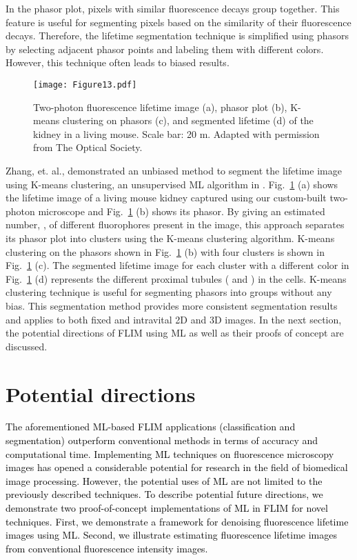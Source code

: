 \documentclass[12pt]{iopart}
\newcommand{\cc}[1]{\textcolor{black}{#1}}
\begin{document}
In the phasor plot, pixels with similar fluorescence decays group together. This feature is useful for segmenting pixels based on the similarity of their fluorescence decays. Therefore, the lifetime segmentation technique is simplified using phasors by selecting adjacent phasor points and labeling them with different colors. However, this technique often leads to biased results.  

\begin{figure}[!t]
\centering
\texttt{[image: Figure13.pdf]}
\caption{Two-photon fluorescence lifetime image (a), phasor plot (b), K-means clustering on phasors (c), and segmented lifetime (d) of the kidney in a living mouse. Scale bar: 20 m. Adapted with permission from \cite{phasors} The Optical Society.}\label{fig1_phasor}
\end{figure}

Zhang, et. al., demonstrated an unbiased method to segment the lifetime image using K-means clustering, an unsupervised ML algorithm in \cite{phasors}. Fig.~\ref{fig1_phasor} (a) shows the lifetime image of a living mouse kidney captured using our custom-built two-photon microscope \cite{instant_flim} and Fig.~\ref{fig1_phasor} (b) shows its phasor. By giving an estimated number, , of different fluorophores present in the image, this approach separates its phasor plot into  clusters using the K-means clustering algorithm. K-means clustering on the phasors shown in Fig.~\ref{fig1_phasor} (b) with four clusters is shown in Fig.~\ref{fig1_phasor} (c). The segmented lifetime image for each cluster with a different color in Fig.~\ref{fig1_phasor} (d) represents the different proximal tubules ( and ) in the cells. K-means clustering technique is useful for segmenting phasors into groups without any bias. This segmentation method provides more consistent segmentation results and applies to both fixed and intravital 2D and 3D images. In the next section, the potential directions of FLIM using ML as well as their proofs of concept are discussed.

\section{Potential directions}\label{potential_dir}
\cc{The aforementioned ML-based FLIM applications (classification and segmentation) outperform conventional methods in terms of accuracy and computational time. Implementing ML techniques on fluorescence microscopy images has opened a considerable potential for research in the field of biomedical image processing. However, the potential uses of ML are not limited to the previously described techniques. To describe potential future directions, we demonstrate two proof-of-concept implementations of ML in FLIM for novel techniques. First, we demonstrate a framework for denoising fluorescence lifetime images using ML. Second, we illustrate estimating fluorescence lifetime images from conventional fluorescence intensity images.}
\end{document}
